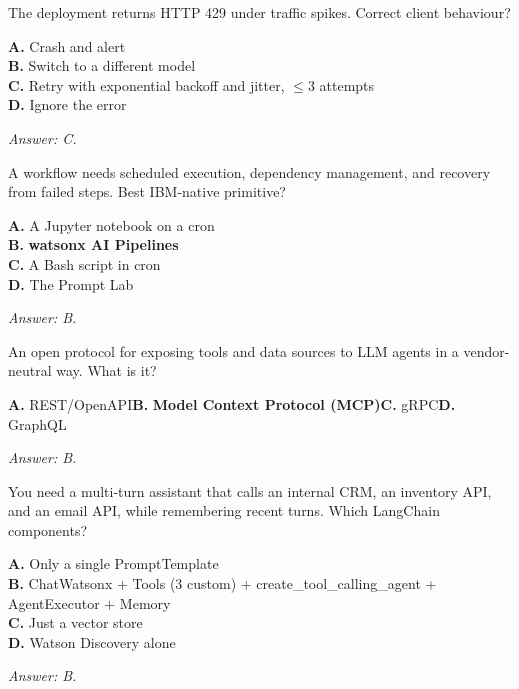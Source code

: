 \begin{practicebox}[title=\textbf{Q6.2 --- Error}]
The deployment returns HTTP 429 under traffic spikes. Correct client behaviour?

\textbf{A.} Crash and alert\\
\textbf{B.} Switch to a different model\\
\textbf{C.} Retry with exponential backoff and jitter, $\leq$3 attempts\\
\textbf{D.} Ignore the error

\vspace{0.2cm}\textit{Answer: C.}
\end{practicebox}

\begin{practicebox}[title=\textbf{Q6.3 --- Orchestration}]
A workflow needs scheduled execution, dependency management, and recovery from failed steps. Best IBM-native primitive?

\textbf{A.} A Jupyter notebook on a cron\\
\textbf{B.} \textbf{watsonx AI Pipelines}\\
\textbf{C.} A Bash script in cron\\
\textbf{D.} The Prompt Lab

\vspace{0.2cm}\textit{Answer: B.}
\end{practicebox}

\begin{practicebox}[title=\textbf{Q6.4 --- MCP}]
An open protocol for exposing tools and data sources to LLM agents in a vendor-neutral way. What is it?

\textbf{A.} REST/OpenAPI\hspace{1em}\textbf{B.} \textbf{Model Context Protocol (MCP)}\hspace{1em}\textbf{C.} gRPC\hspace{1em}\textbf{D.} GraphQL

\vspace{0.2cm}\textit{Answer: B.}
\end{practicebox}

\begin{practicebox}[title=\textbf{Q6.5 --- LangChain}]
You need a multi-turn assistant that calls an internal CRM, an inventory API, and an email API, while remembering recent turns. Which LangChain components?

\textbf{A.} Only a single PromptTemplate\\
\textbf{B.} ChatWatsonx + Tools (3 custom) + create\_tool\_calling\_agent + AgentExecutor + Memory\\
\textbf{C.} Just a vector store\\
\textbf{D.} Watson Discovery alone

\vspace{0.2cm}\textit{Answer: B.}
\end{practicebox}

\cleardoublepage
